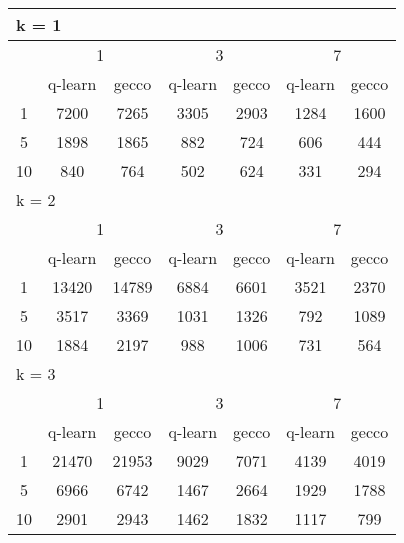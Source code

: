 \begin{table}
 \begin{tabular}{|*7{c|}}
\hline
\multicolumn{7}{|l|}{k = 1} \\
\hline
\multirow{2}{*}{\diagbox{$\mu$}{$\lambda$}} & \multicolumn{2}{c|}{1} & \multicolumn{2}{c|}{3} & \multicolumn{2}{c|}{7} \\
\cline{2-7}
 & q-learn & gecco & q-learn & gecco & q-learn & gecco \\
\hline
1 & 7200 & 7265 & 3305 & 2903 & 1284 & 1600 \\
\hline
5 & 1898 & 1865 & 882 & 724 & 606 & 444 \\
\hline
10 & 840 & 764 & 502 & 624 & 331 & 294 \\
\hline
\multicolumn{7}{|l|}{k = 2} \\
\hline
\multirow{2}{*}{\diagbox{$\mu$}{$\lambda$}} & \multicolumn{2}{c|}{1} & \multicolumn{2}{c|}{3} & \multicolumn{2}{c|}{7} \\
\cline{2-7}
 & q-learn & gecco & q-learn & gecco & q-learn & gecco \\
\hline
1 & 13420 & 14789 & 6884 & 6601 & 3521 & 2370 \\
\hline
5 & 3517 & 3369 & 1031 & 1326 & 792 & 1089 \\
\hline
10 & 1884 & 2197 & 988 & 1006 & 731 & 564 \\
\hline
\multicolumn{7}{|l|}{k = 3} \\
\hline
\multirow{2}{*}{\diagbox{$\mu$}{$\lambda$}} & \multicolumn{2}{c|}{1} & \multicolumn{2}{c|}{3} & \multicolumn{2}{c|}{7} \\
\cline{2-7}
 & q-learn & gecco & q-learn & gecco & q-learn & gecco \\
\hline
1 & 21470 & 21953 & 9029 & 7071 & 4139 & 4019 \\
\hline
5 & 6966 & 6742 & 1467 & 2664 & 1929 & 1788 \\
\hline
10 & 2901 & 2943 & 1462 & 1832 & 1117 & 799 \\
\hline
\end{tabular}
\end{table}

